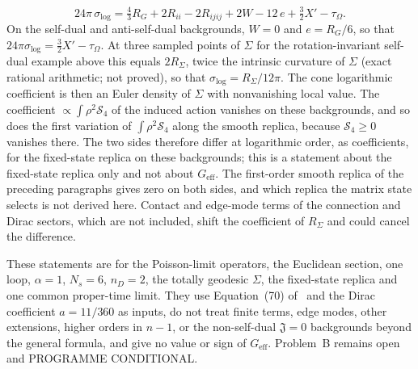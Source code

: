 \[
  24\pi\,\sigma_{\log}=\tfrac43R_G+2R_{ii}-2R_{ijij}+2W-12\,e+\tfrac32X'-\tau_\Omega .
\]
On the self-dual and anti-self-dual backgrounds, \(W=0\) and \(e=R_G/6\), so that \(24\pi\sigma_{\log}=\tfrac32X'-\tau_\Omega\). At three sampled points of \(\Sigma\) for the rotation-invariant self-dual example above this equals \(2R_\Sigma\), twice the intrinsic curvature of \(\Sigma\) (exact rational arithmetic; not proved), so that \(\sigma_{\log}=R_\Sigma/12\pi\). The cone logarithmic coefficient is then an Euler density of \(\Sigma\) with nonvanishing local value. The coefficient \(\propto\int\rho^2\mathcal S_4\) of the induced action vanishes on these backgrounds, and so does the first variation of \(\int\rho^2\mathcal S_4\) along the smooth replica, because \(\mathcal S_4\ge0\) vanishes there. The two sides therefore differ at logarithmic order, as coefficients, for the fixed-state replica on these backgrounds; this is a statement about the fixed-state replica only and not about \(G_{\mathrm{eff}}\). The first-order smooth replica of the preceding paragraphs gives zero on both sides, and which replica the matrix state selects is not derived here. Contact and edge-mode terms of the connection and Dirac sectors, which are not included, shift the coefficient of \(R_\Sigma\) and could cancel the difference.

These statements are for the Poisson-limit operators, the Euclidean section, one loop, \(\alpha=1\), \(N_s=6\), \(n_D=2\), the totally geodesic \(\Sigma\), the fixed-state replica and one common proper-time limit. They use Equation~(70) of~\cite{Solodukhin2011} and the Dirac coefficient \(a=11/360\) as inputs, do not treat finite terms, edge modes, other extensions, higher orders in \(n-1\), or the non-self-dual \(\mathfrak J=0\) backgrounds beyond the general formula, and give no value or sign of \(G_{\mathrm{eff}}\). Problem~B remains open and PROGRAMME CONDITIONAL.

